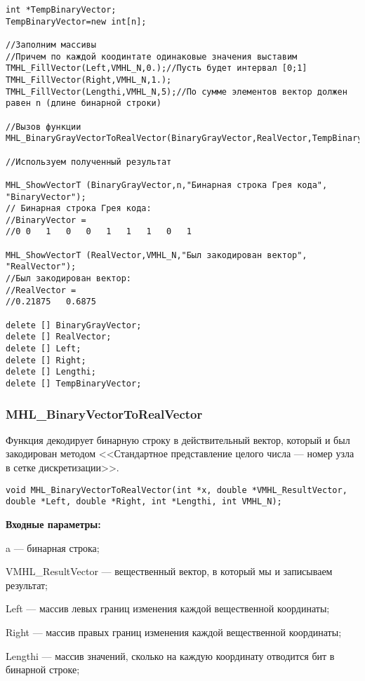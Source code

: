 \documentclass[a4paper,12pt]{article}
\begin{document}
\begin{lstlisting}[label=code_use_MHL_BinaryGrayVectorToRealVector,caption=Пример использования]
int *TempBinaryVector;
TempBinaryVector=new int[n];

//Заполним массивы
//Причем по каждой коодинтате одинаковые значения выставим
TMHL_FillVector(Left,VMHL_N,0.);//Пусть будет интервал [0;1]
TMHL_FillVector(Right,VMHL_N,1.);
TMHL_FillVector(Lengthi,VMHL_N,5);//По сумме элементов вектор должен равен n (длине бинарной строки)

//Вызов функции
MHL_BinaryGrayVectorToRealVector(BinaryGrayVector,RealVector,TempBinaryVector,Left,Right,Lengthi,VMHL_N);

//Используем полученный результат

MHL_ShowVectorT (BinaryGrayVector,n,"Бинарная строка Грея кода", "BinaryVector");
// Бинарная строка Грея кода:
//BinaryVector =
//0	0	1	0	0	1	1	1	0	1

MHL_ShowVectorT (RealVector,VMHL_N,"Был закодирован вектор", "RealVector");
//Был закодирован вектор:
//RealVector =
//0.21875	0.6875

delete [] BinaryGrayVector;
delete [] RealVector;
delete [] Left;
delete [] Right;
delete [] Lengthi;
delete [] TempBinaryVector;
\end{lstlisting}

\subsubsection{MHL\_BinaryVectorToRealVector}\label{MHL_BinaryVectorToRealVector}

Функция декодирует бинарную строку в действительный вектор, который и был закодирован методом <<Стандартное представление целого числа --- номер узла в сетке дискретизации>>.


\begin{lstlisting}[label=code_syntax_MHL_BinaryVectorToRealVector,caption=Синтаксис]
void MHL_BinaryVectorToRealVector(int *x, double *VMHL_ResultVector, double *Left, double *Right, int *Lengthi, int VMHL_N);
\end{lstlisting}

\textbf{Входные параметры:}
 
a --- бинарная строка;
 
VMHL\_ResultVector --- вещественный вектор, в который мы и записываем результат;
 
Left --- массив левых границ изменения каждой вещественной координаты;
 
Right --- массив правых границ изменения каждой вещественной координаты;
 
Lengthi --- массив значений, сколько на каждую координату отводится бит в бинарной строке;
 
\end{document}
